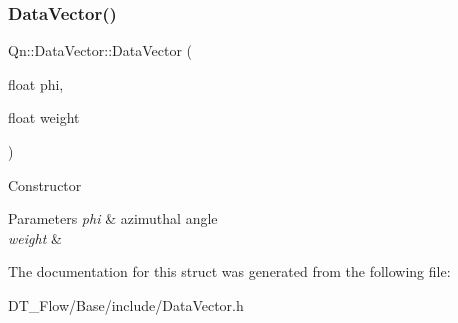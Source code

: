 \subsubsection{\texorpdfstring{Data\+Vector()}{DataVector()}\hspace{0.1cm}{\footnotesize\ttfamily [3/3]}}
{\footnotesize\ttfamily Qn\+::\+Data\+Vector\+::\+Data\+Vector (\begin{DoxyParamCaption}\item[{float}]{phi,  }\item[{float}]{weight }\end{DoxyParamCaption})\hspace{0.3cm}{\ttfamily [inline]}}

Constructor 
\begin{DoxyParams}{Parameters}
{\em phi} & azimuthal angle \\
\hline
{\em weight} & \\
\hline
\end{DoxyParams}


The documentation for this struct was generated from the following file\+:\begin{DoxyCompactItemize}
\item 
D\+T\+\_\+\+Flow/\+Base/include/Data\+Vector.\+h\end{DoxyCompactItemize}
